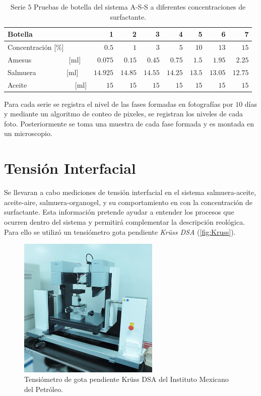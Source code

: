  \begin{table}[H]
    \caption[Pruebas de botella]{Serie $5$ Pruebas de botella del sistema A-S-S a diferentes concentraciones de surfactante.}
    \centering \footnotesize
    \begin{tabulary}{1.1\textwidth}{L |R|R|R|R|R|R|R}
        \toprule
        Botella & \textbf{1} & \textbf{2} & \textbf{3} & \textbf{4} & \textbf{5} & \textbf{6} & \textbf{7}  \\
        \midrule
        Concentración [\%] & $0.5$  & $1$ & $3$  & $5$ &$10$ & $13$ & $15$ \\
        Amesus ~~~~~~~~~~[ml] & $0.075$  & $0.15$ & $0.45$ & $0.75$ & $1.5$ & $1.95$ & $2.25$\\
        Salmuera ~~~~~~~~[ml] & $14.925$ & $14.85$ & $14.55$ & $14.25$ & $13.5$ & $13.05$ & $12.75$  \\
        Aceite ~~~~~~~~~~~~~[ml] & $15$ & $15$ & $15$ & $15$ & $15$ & $15$ & $15$  \\
        \midrule
        \bottomrule
    \end{tabulary}
    \label{tab:serie5}
\end{table}

Para cada serie se registra el nivel de las fases formadas en fotografías por $10$ días y mediante un algoritmo de conteo de pixeles, se registran los niveles de cada foto. Posteriormente se toma una muestra de cada fase formada y es montada en un microscopio.

\section{Tensión Interfacial}
Se llevaran a cabo mediciones de tensión interfacial en el sistema salmuera-aceite, aceite-aire, salmuera-organogel, y su comportamiento en con la concentración de surfactante. Esta información pretende ayudar a entender los procesos que ocurren dentro del sistema y permitirá complementar la descripción reológica. Para ello se utilizó un tensiómetro gota pendiente \emph{Krüss DSA} (\autoref{fig:Kruss}).
\begin{figure}\centering
    \includegraphics[width=0.6\textwidth]{Graphics/Kruss.jpg}
    \caption[Tensiómetro de gota]{Tensiómetro de gota pendiente Krüss DSA del Instituto Mexicano del Petróleo.}
    \label{fig:Kruss}
\end{figure}

